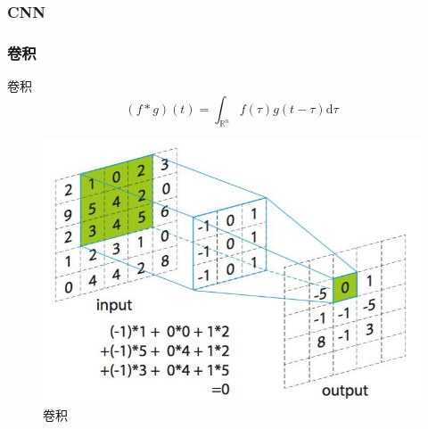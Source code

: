 \subsubsection{CNN}
\begin{frame}
    \frametitle{卷积}
    \begin{definition}{卷积}
        \begin{equation}
            (f*g)(t)=\int_{\mathbb{R}^n}f(\tau)g(t-\tau)\mathrm{d}\tau
        \end{equation}
    \end{definition}

    \begin{figure}
        \includegraphics[width=0.5\linewidth]{../lib/CNN.jpeg}
        \caption{卷积}
        \label{CNN}
    \end{figure}

\end{frame}
